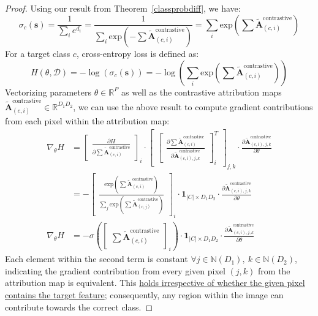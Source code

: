 \documentclass{article}
\theoremstyle{plain}
\theoremstyle{definition}
\theoremstyle{remark}
\newcommand{\contcam}[2]{\tilde{\mathcal{\bm{A}}}^{\text{contrastive}}_{(#1, #2)}}
\begin{document}
\begin{proof}
	Using our result from Theorem~\ref{classprobdiff}, we have:
	\begin{equation}
		\sigma_c(\bm{s}) = \frac{1}{\sum_i e^{d_i}} = \frac{1}{\sum_i \text{exp}({-\sum \contcam{c}{i}})} = \sum_i \text{exp}\left({\sum \contcam{c}{i}}\right)
	\end{equation}
	For a target class $c$, cross-entropy loss is defined as:
	\begin{equation}
		H(\theta, \mathcal{D}) = -\log \left( \sigma_c(\bm{s}) \right) = -\log \left( \sum_i \text{exp}\left({\sum \contcam{c}{i}}\right) \right)
	\end{equation}
	Vectorizing parameters $\theta \in \mathbb{R}^P$ as well as the contrastive attribution maps $\tilde{\mathcal{\bm{A}}}_{(c, i)}^{\text{contrastive}} \in \mathbb{R}^{D_1 D_2}$, we can use the above result to compute gradient contributions from each pixel within the attribution map:
	\begin{align}
		\nabla_\theta H &= \begin{bmatrix} \frac{\partial H}{\partial \sum \tilde{\mathcal{\bm{A}}}_{(c, i)}^{\text{contrastive}}} \end{bmatrix}_i
			\cdot \begin{bmatrix} \begin{bmatrix} \frac{\partial \sum \tilde{\mathcal{\bm{A}}}_{(c, i)}^{\text{contrastive}}}{\partial \tilde{\mathcal{\bm{A}}}_{(c, i), j, k}^{\text{contrastive}}} \end{bmatrix}_{i}^T \end{bmatrix}_{j,k}
			\cdot \frac{\partial \tilde{\mathcal{\bm{A}}}_{(c, i), j, k}^{\text{contrastive}}}{\partial \theta} \\
		&= - \begin{bmatrix} \frac{\text{exp}\left( \sum \contcam{c}{i}\right)}{\sum_j \text{exp}\left({\sum \contcam{c}{j}}\right)} \end{bmatrix}_i \cdot \bm{1}_{|C| \times D_1 D_2} \cdot \frac{\partial \tilde{\mathcal{\bm{A}}}_{(c, i), j, k}^{\text{contrastive}}}{\partial \theta} \\
		\nabla_\theta H &= - \sigma\left( \begin{bmatrix} \sum \contcam{c}{i} \end{bmatrix}_i \right) \cdot \bm{1}_{|C| \times D_1 D_2} \cdot \frac{\partial \tilde{\mathcal{\bm{A}}}_{(c, i), j, k}^{\text{contrastive}}}{\partial \theta}
	\end{align}
	Each element within the second term is constant $\forall j \in \mathbb{N}(D_1),~k \in \mathbb{N}(D_2)$, indicating the gradient contribution from every given pixel $(j, k)$ from the attribution map is equivalent. This \underline{holds irrespective of whether the given pixel contains the target feature}; consequently, any region within the image can contribute towards the correct class.
\end{proof}
\end{document}
